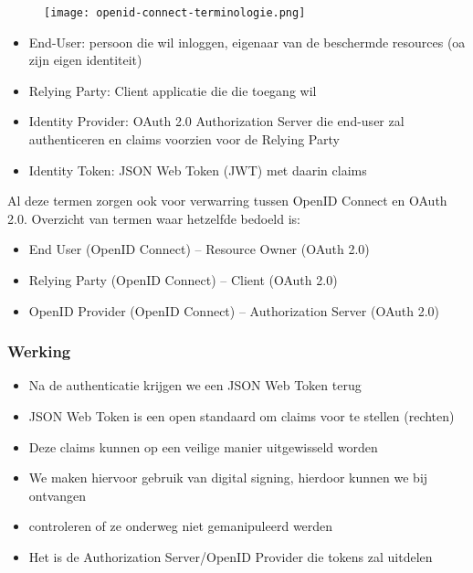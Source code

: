 \documentclass{article}
\begin{document}
\begin{figure}[H]
    \centering
    \texttt{[image: openid-connect-terminologie.png]}
\end{figure}


\begin{itemize}
    \item End-User: persoon die wil inloggen, eigenaar van de beschermde resources (oa zijn eigen identiteit)
    \item Relying Party: Client applicatie die die toegang wil
    \item Identity Provider: OAuth 2.0 Authorization Server die end-user zal authenticeren en claims voorzien voor de Relying Party
    \item Identity Token: JSON Web Token (JWT) met daarin claims
\end{itemize}

Al deze termen zorgen ook voor verwarring tussen OpenID Connect en OAuth 2.0. 
Overzicht van termen waar hetzelfde bedoeld is:

\begin{itemize}
    \item End User (OpenID Connect) – Resource Owner (OAuth 2.0)
    \item Relying Party (OpenID Connect) – Client (OAuth 2.0)
    \item OpenID Provider (OpenID Connect) – Authorization Server (OAuth 2.0)
\end{itemize}


\subsubsection{Werking}

\begin{itemize}
    \item Na de authenticatie krijgen we een JSON Web Token terug
    \item JSON Web Token is een open standaard om claims voor te stellen (rechten)
    \item Deze claims kunnen op een veilige manier uitgewisseld worden
    \item We maken hiervoor gebruik van digital signing, hierdoor kunnen we bij ontvangen
    \item controleren of ze onderweg niet gemanipuleerd werden
    \item Het is de Authorization Server/OpenID Provider die tokens zal uitdelen
\end{itemize}
\end{document}
